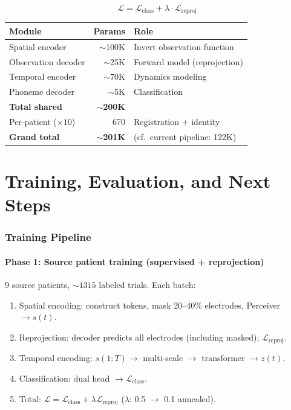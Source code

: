 \documentclass[11pt,letterpaper]{article}
\begin{document}
\begin{equation}
\boxed{\mathcal{L} = \mathcal{L}_{\text{class}} + \lambda \cdot \mathcal{L}_{\text{reproj}}}
\end{equation}

\begin{table}[ht]\centering\small
\begin{tabular}{@{}lrl@{}}
\toprule
\textbf{Module} & \textbf{Params} & \textbf{Role}\\
\midrule
Spatial encoder & ${\sim}$100K & Invert observation function\\
Observation decoder & ${\sim}$25K & Forward model (reprojection)\\
Temporal encoder & ${\sim}$70K & Dynamics modeling\\
Phoneme decoder & ${\sim}$5K & Classification\\
\midrule
\textbf{Total shared} & ${\sim}$\textbf{200K} &\\
Per-patient ($\times 10$) & 670 & Registration + identity\\
\textbf{Grand total} & ${\sim}$\textbf{201K} & (cf.\ current pipeline: 122K)\\
\bottomrule
\end{tabular}
\end{table}



\part{Training, Evaluation, and Next Steps}

\section{Training Pipeline}

\subsection{Phase 1: Source patient training (supervised + reprojection)}

9 source patients, ${\sim}1315$ labeled trials. Each batch:
\begin{enumerate}[leftmargin=2em]
\item Spatial encoding: construct tokens, mask 20--40\% electrodes, Perceiver $\to s(t)$.
\item Reprojection: decoder predicts all electrodes (including masked); $\mathcal{L}_{\text{reproj}}$.
\item Temporal encoding: $s(1{:}T) \to$ multi-scale $\to$ transformer $\to z(t)$.
\item Classification: dual head $\to \mathcal{L}_{\text{class}}$.
\item Total: $\mathcal{L} = \mathcal{L}_{\text{class}} + \lambda \mathcal{L}_{\text{reproj}}$ ($\lambda$: 0.5 $\to$ 0.1 annealed).
\end{enumerate}
\end{document}

